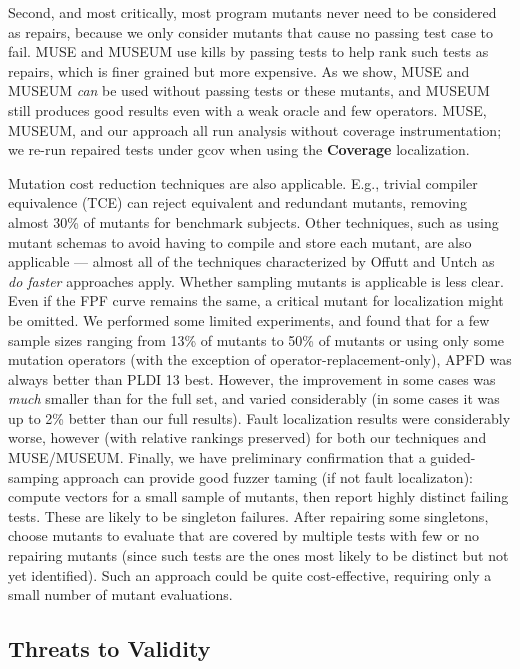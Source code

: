 Second, and most critically, most program mutants never need to be considered as repairs, because we only consider mutants that cause no passing test case to fail.  MUSE and MUSEUM use kills by passing tests to help rank such tests as repairs, which is finer grained but more expensive.  As we show, MUSE and MUSEUM \emph{can}  be used without passing tests or these mutants, and MUSEUM still produces good results even with a weak oracle and few operators.  MUSE, MUSEUM, and our approach all run analysis without coverage instrumentation; we re-run repaired tests under gcov when using the {\bf Coverage} localization.

Mutation cost reduction techniques are also applicable.  E.g., trivial compiler equivalence (TCE) \cite{TCE} can reject equivalent and redundant mutants, removing almost 30\% of mutants for benchmark subjects. Other techniques, such as using mutant schemas to avoid having to compile and store each mutant, are also applicable --- almost all of the techniques characterized by Offutt and Untch \cite{offutt2001mutation} as \emph{do faster} approaches apply.   Whether sampling mutants \cite{RahulISSRE} is applicable is less clear.  Even if the FPF curve remains the same, a critical mutant for localization might be omitted.  We performed some limited experiments, and found that for a few sample sizes ranging from 13\% of mutants to 50\% of mutants or using only some mutation operators (with the exception of operator-replacement-only), APFD was always better than PLDI 13 best.   However, the improvement in some cases was \emph{much} smaller than for the full set, and varied considerably (in some cases it was up to 2\% better than our full results).  Fault localization results were considerably worse, however (with relative rankings preserved) for both our techniques and MUSE/MUSEUM.  Finally, we have preliminary confirmation that a guided-samping approach can provide good fuzzer taming (if not fault localizaton):  compute vectors for a small sample of mutants, then report highly distinct failing tests.  These are likely to be singleton failures.  After repairing some singletons, choose mutants to evaluate that are covered by multiple tests with few or no repairing mutants (since such tests are the ones most likely to be distinct but not yet identified).  Such an approach could be quite cost-effective, requiring only a small number of mutant evaluations.

\subsection{Threats to Validity}

